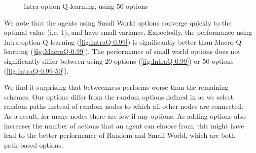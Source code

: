 \begin{figure}[ht]
    \centering
    \caption{Intra-option Q-learning, using 50 options }
    \label{fig:IntraQ-0.99-50}
\end{figure}

We note that the agents using Small World options converge quickly to the
optimal value (i.e. 1), and have small variance. Expectedly, the performance
using Intra-option Q-learning (\autoref{fig:IntraQ-0.99}) is significantly
better than Macro Q-learning (\autoref{fig:MacroQ-0.99}). The performance of
small world options does not significantly differ between using 20 options
(\autoref{fig:IntraQ-0.99}) or 50 options (\autoref{fig:IntraQ-0.99-50}).

We find it surprising that betweenness performs worse than the remaining
schemes. Our options differ from the random options defined in \cite{Simsek} as
we select random paths instead of random nodes to which all other nodes are
connected. As a result, for many nodes there are few if any options. As adding
options also increases the number of actions that an agent can choose from, this
might have lead to the better performance of Random and Small World, which are
both path-based options.

